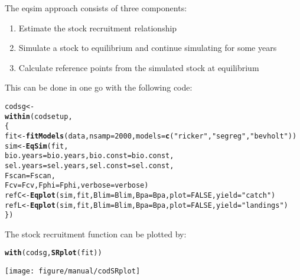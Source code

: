 \documentclass[a4paper]{article}\usepackage{graphicx, color}
\makeatletter
\def\maxwidth{ %
  \ifdim\Gin@nat@width>\linewidth
    \linewidth
  \else
    \Gin@nat@width
  \fi
}
\newcommand{\hlfunctioncall}[1]{\textcolor[rgb]{0.501960784313725,0,0.329411764705882}{\textbf{#1}}}%
\newcommand{\hlstring}[1]{\textcolor[rgb]{0.6,0.6,1}{#1}}%
\newenvironment{kframe}{%
 \def\at@end@of@kframe{}%
 \ifinner\ifhmode%
  \def\at@end@of@kframe{\end{minipage}}%
  \begin{minipage}{\columnwidth}%
 \fi\fi%
 \def\FrameCommand##1{\hskip\@totalleftmargin \hskip-\fboxsep
 \colorbox{shadecolor}{##1}\hskip-\fboxsep
     \hskip-\linewidth \hskip-\@totalleftmargin \hskip\columnwidth}%
 \MakeFramed {\advance\hsize-\width
   \@totalleftmargin\z@ \linewidth\hsize
   \@setminipage}}%
 {\par\unskip\endMakeFramed%
 \at@end@of@kframe}
\newenvironment{knitrout}{}{} %
\makeatother
\begin{document}
The eqsim approach consists of three components:
\begin{enumerate}
  \item Estimate the stock recruitment relationship
  \item Simulate a stock to equilibrium and continue simulating for some years
  \item Calculate reference points from the simulated stock at equilibrium
\end{enumerate}

This can be done in one go with the following code:
\begin{knitrout}
\color{fgcolor}\begin{kframe}
\begin{alltt}
codsg <-
  \hlfunctioncall{within}(codsetup,
\{
  fit <- \hlfunctioncall{fitModels}(data, nsamp = 2000, models = \hlfunctioncall{c}(\hlstring{"ricker"}, \hlstring{"segreg"}, \hlstring{"bevholt"}))
  sim <- \hlfunctioncall{EqSim}(fit,
               bio.years = bio.years, bio.const=bio.const,
               sel.years = sel.years, sel.const=sel.const,
               Fscan = Fscan, 
               Fcv=Fcv,Fphi=Fphi,verbose = verbose)
  refC <- \hlfunctioncall{Eqplot}(sim, fit, Blim = Blim, Bpa = Bpa, plot = FALSE, yield=\hlstring{"catch"})
  refL <- \hlfunctioncall{Eqplot}(sim, fit, Blim = Blim, Bpa = Bpa, plot = FALSE, yield=\hlstring{"landings"})
\})
\end{alltt}
\end{kframe}
\end{knitrout}


The stock recruitment function can be plotted by:
\begin{knitrout}
\color{fgcolor}\begin{kframe}
\begin{alltt}
\hlfunctioncall{with}(codsg,\hlfunctioncall{SRplot}(fit))
\end{alltt}
\end{kframe}

{\centering \texttt{[image: figure/manual/codSRplot]} 

}



\end{knitrout}
\end{document}
